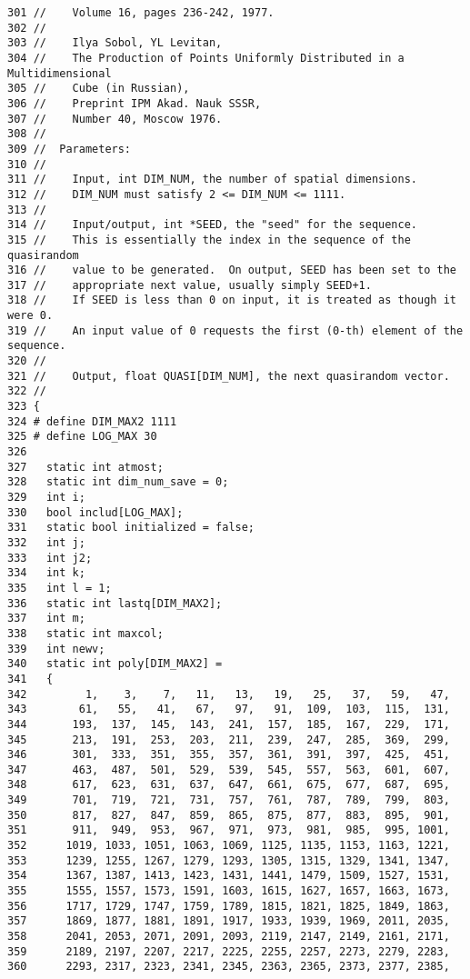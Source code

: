 \begin{Code}
\begin{verbatim}
301 //    Volume 16, pages 236-242, 1977.
302 //
303 //    Ilya Sobol, YL Levitan, 
304 //    The Production of Points Uniformly Distributed in a Multidimensional 
305 //    Cube (in Russian),
306 //    Preprint IPM Akad. Nauk SSSR, 
307 //    Number 40, Moscow 1976.
308 //
309 //  Parameters:
310 //
311 //    Input, int DIM_NUM, the number of spatial dimensions.
312 //    DIM_NUM must satisfy 2 <= DIM_NUM <= 1111.
313 //
314 //    Input/output, int *SEED, the "seed" for the sequence.
315 //    This is essentially the index in the sequence of the quasirandom
316 //    value to be generated.  On output, SEED has been set to the
317 //    appropriate next value, usually simply SEED+1.
318 //    If SEED is less than 0 on input, it is treated as though it were 0.
319 //    An input value of 0 requests the first (0-th) element of the sequence.
320 //
321 //    Output, float QUASI[DIM_NUM], the next quasirandom vector.
322 //
323 {
324 # define DIM_MAX2 1111
325 # define LOG_MAX 30
326 
327   static int atmost;
328   static int dim_num_save = 0;
329   int i;
330   bool includ[LOG_MAX];
331   static bool initialized = false;
332   int j;
333   int j2;
334   int k;
335   int l = 1;
336   static int lastq[DIM_MAX2];
337   int m;
338   static int maxcol;
339   int newv;
340   static int poly[DIM_MAX2] =
341   {
342         1,    3,    7,   11,   13,   19,   25,   37,   59,   47,
343        61,   55,   41,   67,   97,   91,  109,  103,  115,  131,
344       193,  137,  145,  143,  241,  157,  185,  167,  229,  171,
345       213,  191,  253,  203,  211,  239,  247,  285,  369,  299,
346       301,  333,  351,  355,  357,  361,  391,  397,  425,  451,
347       463,  487,  501,  529,  539,  545,  557,  563,  601,  607,
348       617,  623,  631,  637,  647,  661,  675,  677,  687,  695, 
349       701,  719,  721,  731,  757,  761,  787,  789,  799,  803,
350       817,  827,  847,  859,  865,  875,  877,  883,  895,  901,
351       911,  949,  953,  967,  971,  973,  981,  985,  995, 1001,
352      1019, 1033, 1051, 1063, 1069, 1125, 1135, 1153, 1163, 1221,
353      1239, 1255, 1267, 1279, 1293, 1305, 1315, 1329, 1341, 1347,
354      1367, 1387, 1413, 1423, 1431, 1441, 1479, 1509, 1527, 1531,
355      1555, 1557, 1573, 1591, 1603, 1615, 1627, 1657, 1663, 1673, 
356      1717, 1729, 1747, 1759, 1789, 1815, 1821, 1825, 1849, 1863,
357      1869, 1877, 1881, 1891, 1917, 1933, 1939, 1969, 2011, 2035,
358      2041, 2053, 2071, 2091, 2093, 2119, 2147, 2149, 2161, 2171,
359      2189, 2197, 2207, 2217, 2225, 2255, 2257, 2273, 2279, 2283,
360      2293, 2317, 2323, 2341, 2345, 2363, 2365, 2373, 2377, 2385,

\end{verbatim}
\end{Code}
